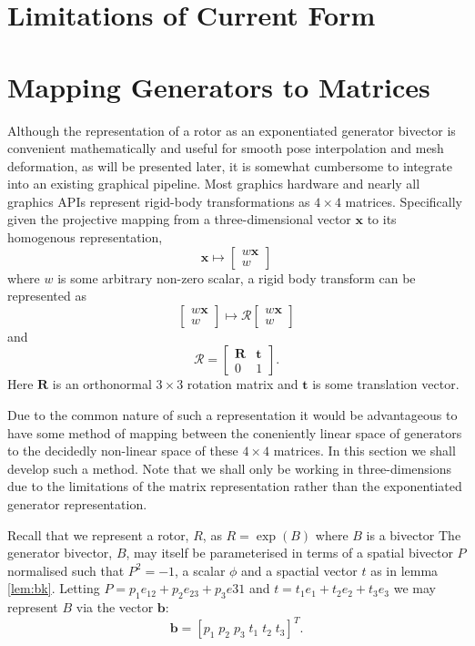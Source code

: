 \section{Limitations of Current Form}


\section{Mapping Generators to Matrices}

Although the representation of a rotor as an exponentiated generator bivector
is convenient mathematically and useful for smooth pose interpolation
and mesh deformation, as will be presented later, it is somewhat cumbersome
to integrate into an existing graphical pipeline. Most graphics hardware and
nearly all graphics APIs represent rigid-body transformations as $4 \times 4$ matrices.
Specifically given the projective mapping from a three-dimensional vector $\mathbf{x}$ to
its homogenous representation,
\[
\mathbf{x} \mapsto \left[ \begin{array}{c}
w \mathbf{x} \\ w
\end{array}\right]
\]
where $w$ is some arbitrary non-zero scalar, a rigid body transform can be represented as
\[
 \left[ \begin{array}{c}
w \mathbf{x} \\ w
\end{array}\right]
\mapsto
 \mathcal{R}\left[ \begin{array}{c}
w \mathbf{x} \\ w
\end{array}\right]
\]
and
\[
\mathcal{R} = \left[
\begin{array}{cc}
\mathbf{R} & \mathbf{t} \\
                0 & 1
\end{array}
\right].
\]
Here $\mathbf{R}$ is an orthonormal $3 \times 3$ rotation matrix and $\mathbf{t}$ is some
translation vector.

Due to the common nature of such a representation it would be advantageous
to have some method of mapping between the coneniently linear space of generators
to the decidedly non-linear space of these $4 \times 4$ matrices. In this section
we shall develop such a method. Note that we shall only be working in three-dimensions due
to the limitations of the matrix representation rather than the exponentiated
generator representation.

Recall that we represent a rotor, $R$, as $R = \exp(B)$ where $B$ is a bivector
The generator bivector, $B$, may itself be
parameterised in terms of a spatial bivector $P$ normalised such that
$P^2 = -1$, a scalar $\phi$ and a spactial vector $t$
as in lemma \ref{lem:bk}.
Letting $P = p_1 e_{12} + p_2 e_{23} + p_3 e{31}$ and
$t = t_1 e_1 + t_2 e_2 + t_3 e_3$ we may represent $B$ via the
vector $\mathbf{b}$:
\[
\mathbf{b} = [ p_1 \; p_2 \; p_3 \; t_1 \; t_2 \; t_3 ]^T.
\]

